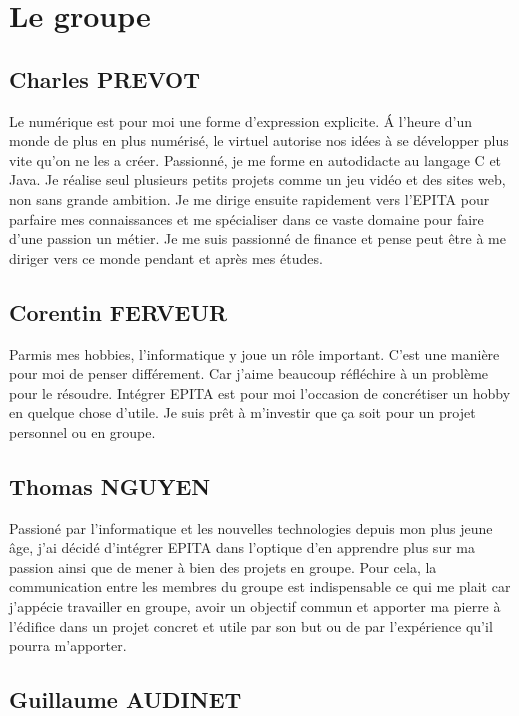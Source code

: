 \documentclass[a4paper,12pt]{article}
\begin{document}
\newpage

\section {Le groupe}

\subsection{Charles PREVOT}

Le numérique est pour moi une forme d'expression explicite. Á l'heure d'un monde de plus en plus numérisé, le virtuel autorise nos idées à se développer plus vite qu'on ne les a créer. Passionné, je me forme en autodidacte au langage C et Java. Je réalise seul plusieurs petits projets comme un jeu vidéo et des sites web, non sans grande ambition. Je me dirige ensuite rapidement vers l'EPITA pour parfaire mes connaissances et me spécialiser dans ce vaste domaine pour faire d'une passion un métier. Je me suis passionné de finance et pense peut être à me diriger vers ce monde pendant et après mes études.


\subsection{Corentin FERVEUR}

Parmis mes hobbies, l'informatique y joue un rôle important. C'est une manière pour moi de penser différement. Car j'aime beaucoup réfléchire à un problème pour le résoudre. Intégrer EPITA est pour moi l'occasion de concrétiser un hobby en quelque chose d'utile. Je suis prêt à m'investir que ça soit pour un projet personnel ou en groupe.

\subsection{Thomas NGUYEN}

Passioné par l'informatique et les nouvelles technologies depuis mon plus jeune âge, j'ai décidé d'intégrer EPITA dans l'optique d'en apprendre plus sur ma passion ainsi que de mener à bien des projets en groupe. Pour cela, la communication entre les membres du groupe est indispensable ce qui me plait car j'appécie travailler en groupe, avoir un objectif commun et apporter ma pierre à l'édifice dans un projet concret et utile par son but ou de par l'expérience qu'il pourra m'apporter.

\newpage

\subsection{Guillaume AUDINET}
\end{document}
